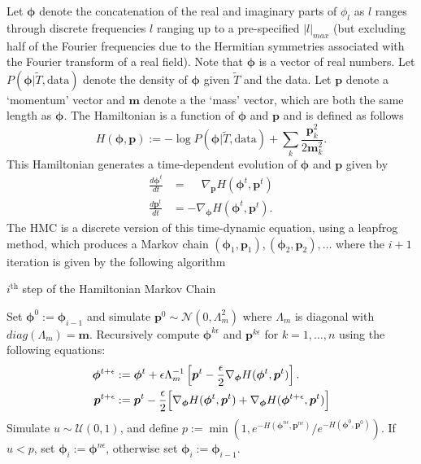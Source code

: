 \documentclass[noinfoline]{imsart}
\newcommand{\bs}{\boldsymbol}
\begin{document}
Let $\bs \phi$ denote the concatenation of the real and imaginary parts of $\phi_l$ as $l$ ranges through discrete frequencies $l$ ranging up to a pre-specified $|l|_{max}$ (but excluding  half of the Fourier frequencies due to the Hermitian symmetries associated with the Fourier transform of a real field). Note that $\bs \phi$ is a vector of real numbers. 
Let $P(\bs \phi|\widetilde T, \text{data})$ denote the density of $\bs \phi$ given $\widetilde T$ and the data. 
Let $\bs p$ denote a `momentum' vector and $\bs m$ denote a the `mass' vector, which are both the same length as $\bs \phi$. The Hamiltonian is a function of $\bs \phi$ and $\bs p$ and is defined as follows
\[ H(\bs \phi, \bs p):= -\log P(\bs \phi|\widetilde T, \text{data})+\sum_k \frac{\bs p_k^2}{2\bs m_k^2}. \]
This Hamiltonian generates a time-dependent evolution of $\bs \phi$ and $\bs p$ given by 
\begin{align*}
\frac{d\bs \phi^t}{dt} &= \phantom{-}\nabla_{\bs p} H(\bs \phi^t, \bs p^t) \\
\frac{d\bs p^t}{dt}    &= -\nabla_{\bs \phi} H(\bs \phi^t, \bs p^t).
\end{align*} 
The HMC is a discrete version of  this time-dynamic equation, using a leapfrog method, which produces a Markov chain $(\bs \phi_1, \bs p_1), (\bs \phi_2, \bs p_2), \ldots$ where the $i+1$ iteration is given by the following algorithm
\begin{algorithm}[H]
\small
\caption{ $i^\text{th}$ step of the Hamiltonian Markov Chain}
\label{ith step of HMC}
\begin{algorithmic}[1]
\State Set $\bs \phi^0:= \bs \phi_{i-1}$ and simulate $\bs p^0 \sim \mathcal N(0,\Lambda_m^2 )$ where $\Lambda_m$ is diagonal with  $diag(\Lambda_m)=\bs m$.
\State  Recursively compute $\bs \phi^{k\epsilon}$ and $\bs p^{k\epsilon}$ for $k=1,\ldots, n$ using the following equations:
\begin{align*}
\bs \phi^{t+\epsilon} &:= \bs \phi^{t} + \epsilon \Lambda_m^{-1} \left[ \bs p^t - \frac{\epsilon}{2} \nabla_{\bs \phi} H(\bs \phi^t, \bs p^t) \right]. \\
\bs p^{t+\epsilon} &:= \bs p^{t} - \frac{\epsilon}{2}\Bigl[ \nabla_{\bs \phi} H(\bs \phi^t, \bs p^t) + \nabla_{\bs \phi} H(\bs \phi^{t+\epsilon}, \bs p^t)\Bigr]
\end{align*}
\State Simulate $u\sim \mathcal U(0,1)$, and define $p:= \min\left(1,{e^{- H(\bs \phi^{n\epsilon}, \bs p^{n\epsilon})}}/{e^{-H(\bs \phi^0, \bs p^0)}}\right)$.
\State  If $u< p$,  set $\bs \phi_{i}:= \bs \phi^{n\epsilon}$, otherwise set  $\bs \phi_{i}:= \bs \phi_{i-1}$.
\end{algorithmic}
\end{algorithm}
\end{document}
